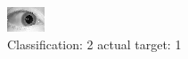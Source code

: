 \begin{figure}[h!]
\begin{center}
\includegraphics[width=0.60\columnwidth]{figures/ID1501_class_2_target_1.png}
\end{center}
\caption{ Classification: 2 actual target: 1}
\label{fig:ID1501_class_2_target_1}
\end{figure}

